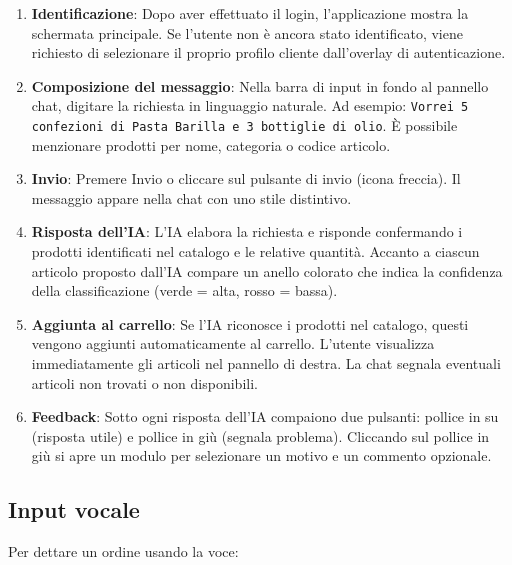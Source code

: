 \begin{enumerate}
    \item \textbf{Identificazione}: Dopo aver effettuato il login, l'applicazione mostra la schermata principale. Se l'utente non \`e ancora stato identificato, viene richiesto di selezionare il proprio profilo cliente dall'overlay di autenticazione.
    \item \textbf{Composizione del messaggio}: Nella barra di input in fondo al pannello chat, digitare la richiesta in linguaggio naturale. Ad esempio: \texttt{Vorrei 5 confezioni di Pasta Barilla e 3 bottiglie di olio}. \`E possibile menzionare prodotti per nome, categoria o codice articolo.
    \item \textbf{Invio}: Premere Invio o cliccare sul pulsante di invio (icona freccia). Il messaggio appare nella chat con uno stile distintivo.
    \item \textbf{Risposta dell'IA}: L'IA elabora la richiesta e risponde confermando i prodotti identificati nel catalogo e le relative quantit\`a. Accanto a ciascun articolo proposto dall'IA compare un anello colorato che indica la confidenza della classificazione (verde = alta, rosso = bassa).
    \item \textbf{Aggiunta al carrello}: Se l'IA riconosce i prodotti nel catalogo, questi vengono aggiunti automaticamente al carrello. L'utente visualizza immediatamente gli articoli nel pannello di destra. La chat segnala eventuali articoli non trovati o non disponibili.
    \item \textbf{Feedback}: Sotto ogni risposta dell'IA compaiono due pulsanti: pollice in su (risposta utile) e pollice in gi\`u (segnala problema). Cliccando sul pollice in gi\`u si apre un modulo per selezionare un motivo e un commento opzionale.
\end{enumerate}

\subsection{Input vocale}

Per dettare un ordine usando la voce:

